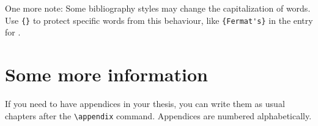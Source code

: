 \documentclass[a4paper, 11pt]{report}
\theoremstyle{plain}
\theoremstyle{definition}
\theoremstyle{remark}
\begin{document}
One more note: Some bibliography styles may change the capitalization of words.
Use \verb|{}| to protect specific words from this behaviour,
like \verb|{Fermat's}| in the entry for \cite{wiles}.




%
%
\printbibliography[heading=bibintoc]




%
%
\appendix

\chapter{Some more information}

If you need to have appendices in your thesis,
you can write them as usual chapters after the \verb|\appendix| command.
Appendices are numbered alphabetically.
\end{document}
